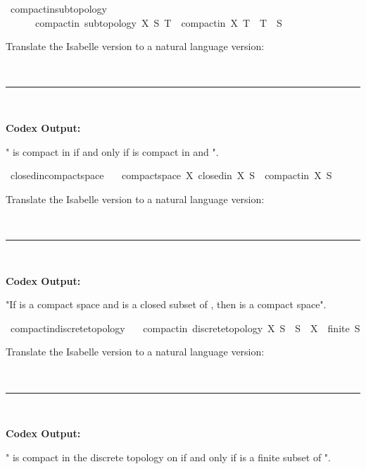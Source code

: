 \documentclass{article}
\begin{document}
\begin{boxB}
\begin{isabelle}
\isamarkupfalse \ compactin{\isacharunderscore}{\kern0pt}subtopology{\isacharcolon}{\kern0pt}\ \isanewline
\ \ \ \ \ \ {\isachardoublequoteopen}compactin\ {\isacharparenleft}{\kern0pt}subtopology\ X\ S{\isacharparenright}{\kern0pt}\ T\ {\isasymlongleftrightarrow}\ compactin\ X\ T\ {\isasymand}\ T\ {\isasymsubseteq}\ S{\isachardoublequoteclose}
\end{isabelle}
Translate the Isabelle version to a natural language version:

\
\hrule
\

\textbf{Codex Output:}

" is compact in  if and only if  is compact in  and ".
\end{boxB}

\begin{boxB}
\begin{isabelle}
\isamarkupfalse \ closedin{\isacharunderscore}{\kern0pt}compact{\isacharunderscore}{\kern0pt}space{\isacharcolon}{\kern0pt}\isanewline
\ \ \ {\isachardoublequoteopen}{\isasymlbrakk}compact{\isacharunderscore}{\kern0pt}space\ X{\isacharsemicolon}{\kern0pt}\ closedin\ X\ S{\isasymrbrakk}\ {\isasymLongrightarrow}\ compactin\ X\ S{\isachardoublequoteclose}
\end{isabelle}
Translate the Isabelle version to a natural language version:

\
\hrule
\

\textbf{Codex Output:}

"If  is a compact space and  is a closed subset of , then  is a compact space".
\end{boxB}

\begin{boxB}
\begin{isabelle}
\isacommand{lemma}\isamarkupfalse \ compactin{\isacharunderscore}{\kern0pt}discrete{\isacharunderscore}{\kern0pt}topology{\isacharcolon}{\kern0pt}\isanewline
\ \ \ {\isachardoublequoteopen}compactin\ {\isacharparenleft}{\kern0pt}discrete{\isacharunderscore}{\kern0pt}topology\ X{\isacharparenright}{\kern0pt}\ S\ {\isasymlongleftrightarrow}\ S\ {\isasymsubseteq}\ X\ {\isasymand}\ finite\ S{\isachardoublequoteclose}
\end{isabelle}
Translate the Isabelle version to a natural language version:

\
\hrule
\

\textbf{Codex Output:}

" is compact in the discrete topology on  if and only if  is a finite subset of ".
\end{boxB}
\end{document}
